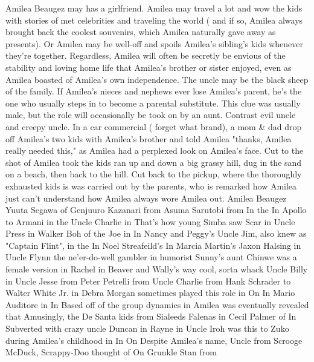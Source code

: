 \documentclass[12pt]{book}
\begin{document}
Amilea Beaugez may has a girlfriend. Amilea may travel a lot and wow the kids with stories of met celebrities and traveling the world ( and if so, Amilea always brought back the coolest souvenirs, which Amilea naturally gave away as presents). Or Amilea may be well-off and spoils Amilea's sibling's kids whenever they're together. Regardless, Amilea will often be secretly be envious of the stability and loving home life that Amilea's brother or sister enjoyed, even as Amilea boasted of Amilea's own independence. The uncle may be the black sheep of the family. If Amilea's nieces and nephews ever lose Amilea's parent, he's the one who usually steps in to become a parental substitute. This clue was usually male, but the role will occasionally be took on by an aunt. Contrast evil uncle and creepy uncle. In a car commercial ( forget what brand), a mom \& dad drop off Amilea's two kids with Amilea's brother and told Amilea "thanks, Amilea really needed this," as Amilea had a perplexed look on Amilea's face. Cut to the shot of Amilea took the kids ran up and down a big grassy hill, dug in the sand on a beach, then back to the hill. Cut back to the pickup, where the thoroughly exhausted kids is was carried out by the parents, who is remarked how Amilea just can't understand how Amilea always wore Amilea out. Amilea Beaugez Yuuta Segawa of Genjuuro Kazanari from Asuma Sarutobi from In the In Apollo to Armani in the Uncle Charlie in That's how young Simba saw Scar in Uncle Press in Walker Boh of the Joe in In Nancy and Peggy's Uncle Jim, also knew as "Captain Flint", in the In Noel Streafeild's In Marcia Martin's Jaxon Halsing in Uncle Flynn the ne'er-do-well gambler in humorist Sunny's aunt Chinwe was a female version in Rachel in Beaver and Wally's way cool, sorta whack Uncle Billy in Uncle Jesse from Peter Petrelli from Uncle Charlie from Hank Schrader to Walter White Jr. in Debra Morgan sometimes played this role in On In Mario Auditore in In Based off of the group dynamics in Amilea was eventually revealed that Amusingly, the De Santa kids from Sialeeds Falenas in Cecil Palmer of In Subverted with crazy uncle Duncan in Rayne in Uncle Iroh was this to Zuko during Amilea's childhood in In On Despite Amilea's name, Uncle from Scrooge McDuck, Scrappy-Doo thought of On Grunkle Stan from
\end{document}
